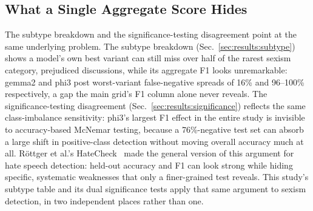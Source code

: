 \subsection{What a Single Aggregate Score Hides}
\label{sec:discussion:aggregate}

The subtype breakdown and the significance-testing disagreement point at
the same underlying problem. The subtype breakdown
(Sec.~\ref{sec:results:subtype}) shows a model's own best variant can
still miss over half of the rarest sexism category, prejudiced
discussions, while its aggregate F1 looks unremarkable: gemma2 and
phi3 post worst-variant false-negative spreads of 16\% and 96--100\%
respectively, a gap the main grid's F1 column alone never reveals. The
significance-testing disagreement (Sec.~\ref{sec:results:significance})
reflects the same class-imbalance sensitivity: phi3's largest F1 effect
in the entire study is invisible to accuracy-based McNemar testing,
because a 76\%-negative test set can absorb a large shift in
positive-class detection without moving overall accuracy much at all.
Röttger et al.'s HateCheck~\cite{rottger2020hatecheck} made the general
version of this argument for hate speech detection: held-out accuracy
and F1 can look strong while hiding specific, systematic weaknesses that
only a finer-grained test reveals. This study's subtype table and its
dual significance tests apply that same argument to sexism detection, in
two independent places rather than one.
